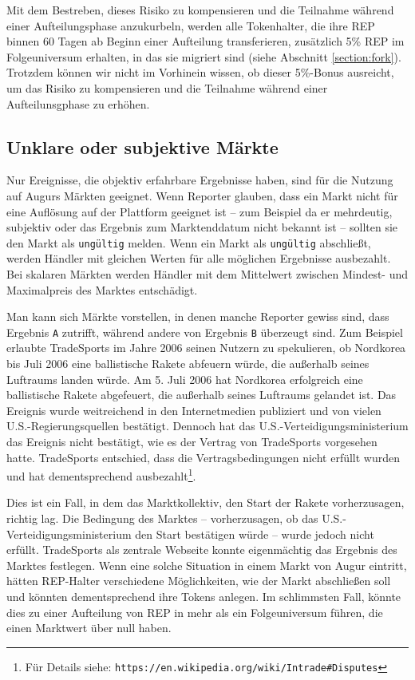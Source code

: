 \documentclass[floatfix,reprint,nofootinbib,amsmath,amssymb,epsfig,pre,floats,letterpaper,groupedaffiliation]{revtex4-1}
\theoremstyle{definition}
\theoremstyle{definition}
\theoremstyle{definition}
\begin{document}
Mit dem Bestreben, dieses Risiko zu kompensieren und die Teilnahme während einer Aufteilungsphase anzukurbeln, werden alle Tokenhalter, die ihre REP binnen 60 Tagen ab Beginn einer Aufteilung transferieren, zusätzlich 5\% REP im Folgeuniversum erhalten, in das sie migriert sind (siehe Abschnitt \ref{section:fork}). Trotzdem können wir nicht im Vorhinein wissen, ob dieser 5\%-Bonus ausreicht, um das Risiko zu kompensieren und die Teilnahme während einer Aufteilunsgphase zu erhöhen.

\subsection{Unklare oder subjektive Märkte}\label{section:ambiguous_or_subjective_markets}

Nur Ereignisse, die objektiv erfahrbare Ergebnisse haben, sind für die Nutzung auf Augurs Märkten geeignet. Wenn Reporter glauben, dass ein Markt nicht für eine Auflösung auf der Plattform geeignet ist – zum Beispiel da er mehrdeutig, subjektiv oder das Ergebnis zum Marktenddatum nicht bekannt ist – sollten sie den Markt als \texttt{ungültig} melden. Wenn ein Markt als \texttt{ungültig} abschließt, werden Händler mit gleichen Werten für alle möglichen Ergebnisse ausbezahlt. Bei skalaren Märkten werden Händler mit dem Mittelwert zwischen Mindest- und Maximalpreis des Marktes entschädigt.

Man kann sich Märkte vorstellen, in denen manche Reporter gewiss sind, dass Ergebnis \texttt{A} zutrifft, während andere von Ergebnis \texttt{B} überzeugt sind. Zum Beispiel erlaubte TradeSports im Jahre 2006 seinen Nutzern zu spekulieren, ob Nordkorea bis Juli 2006 eine ballistische Rakete abfeuern würde, die außerhalb seines Luftraums landen würde. Am 5. Juli 2006 hat Nordkorea erfolgreich eine ballistische Rakete abgefeuert, die außerhalb seines Luftraums gelandet ist. Das Ereignis wurde weitreichend in den Internetmedien publiziert und von vielen U.S.-Regierungsquellen bestätigt. Dennoch hat das U.S.-Verteidigungsministerium das Ereignis nicht bestätigt, wie es der Vertrag von TradeSports vorgesehen hatte. TradeSports entschied, dass die Vertragsbedingungen nicht erfüllt wurden und hat dementsprechend ausbezahlt\footnote{Für Details siehe: \texttt{https://en.wikipedia.org/wiki/Intrade\#Disputes}}.

Dies ist ein Fall, in dem das Marktkollektiv, den Start der Rakete vorherzusagen, richtig lag. Die Bedingung des Marktes – vorherzusagen, ob das U.S.-Verteidigungsministerium den Start bestätigen würde – wurde jedoch nicht erfüllt. TradeSports als zentrale Webseite konnte eigenmächtig das Ergebnis des Marktes festlegen. Wenn eine solche Situation in einem Markt von Augur eintritt, hätten REP-Halter verschiedene Möglichkeiten, wie der Markt abschließen soll und könnten dementsprechend ihre Tokens anlegen. Im schlimmsten Fall, könnte dies zu einer Aufteilung von REP in mehr als ein Folgeuniversum führen, die einen Marktwert über null haben.
\end{document}
